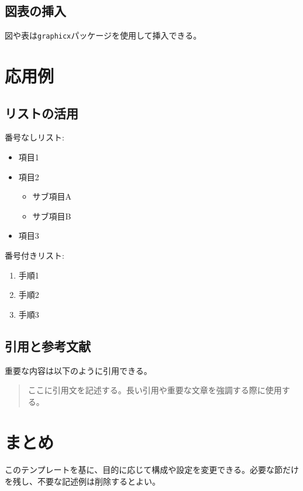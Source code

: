 \documentclass[dvipdfmx,uplatex,a4paper,10pt]{jsarticle}
\begin{document}
\subsection{図表の挿入}

図や表は\texttt{graphicx}パッケージを使用して挿入できる。


\section{応用例}

\subsection{リストの活用}

番号なしリスト:
\begin{itemize}
\item 項目1
\item 項目2
  \begin{itemize}
  \item サブ項目A
  \item サブ項目B
  \end{itemize}
\item 項目3
\end{itemize}

番号付きリスト:
\begin{enumerate}
\item 手順1
\item 手順2
\item 手順3
\end{enumerate}

\subsection{引用と参考文献}

重要な内容は以下のように引用できる。

\begin{quote}
ここに引用文を記述する。長い引用や重要な文章を強調する際に使用する。
\end{quote}

\section{まとめ}

このテンプレートを基に、目的に応じて構成や設定を変更できる。必要な節だけを残し、不要な記述例は削除するとよい。
\end{document}
